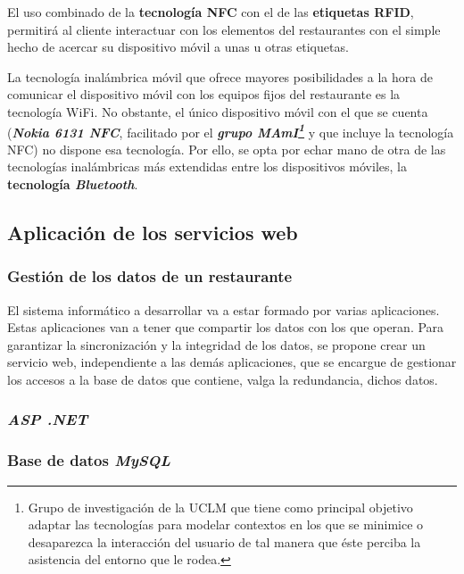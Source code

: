   El uso combinado de la \textbf{tecnología \acs{NFC}} con el de las
  \textbf{etiquetas \acs{RFID}}, permitirá al cliente interactuar con los
  elementos del restaurantes con el simple hecho de acercar su dispositivo
  móvil a unas u otras etiquetas.

  La tecnología inalámbrica móvil que ofrece mayores posibilidades a la hora
  de comunicar el dispositivo móvil con los equipos fijos del restaurante es
  la tecnología \acs{WiFi}. No obstante, el único dispositivo móvil con el que
  se cuenta (\emph{\textbf{Nokia 6131 \acs{NFC}}}, facilitado por el
  \textbf{\emph{grupo \acs{MAmI}\footnote{Grupo de investigación de la
  \acs{UCLM} que tiene como principal objetivo adaptar las tecnologías para 
  modelar contextos en los que se minimice o desaparezca la interacción del 
  usuario de tal manera que éste perciba la asistencia del entorno que le 
  rodea.}}} y que incluye la tecnología \acs{NFC}) no
  dispone esa tecnología. Por ello, se opta por echar mano de otra de las
  tecnologías inalámbricas más extendidas entre los dispositivos móviles, la
  \textbf{tecnología \emph{Bluetooth}}.

  \subsection{Aplicación de los servicios web}
    \subsubsection{Gestión de los datos de un restaurante}
  El sistema informático a desarrollar va a estar formado por varias
  aplicaciones. Estas aplicaciones van a tener que compartir los datos con
  los que operan. Para garantizar la sincronización y la integridad de los
  datos, se propone crear un servicio web, independiente a las demás
  aplicaciones, que se encargue de gestionar los accesos a la base de datos
  que contiene, valga la redundancia, dichos datos.

    \subsubsection{\emph{ASP .NET}}

    \subsubsection{Base de datos \emph{MySQL}}

